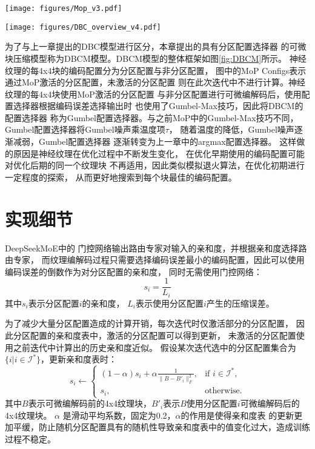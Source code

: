 \begin{figure*}[htbp]
    \centering
    \texttt{[image: figures/Mop\_v3.pdf]}
    \caption{基于混合专家模型的分区配置选择器(MoP)}
    \label{fig:Mop}
\end{figure*}

\begin{figure*}[htbp]
    \centering
    \texttt{[image: figures/DBC\_overview\_v4.pdf]}
    \caption{基于MoP的DBCM模型的整体框架}
    \label{fig:DBCM}
\end{figure*}

为了与上一章提出的DBC模型进行区分，本章提出的具有分区配置选择器
的可微块压缩模型称为DBCM模型。DBCM模型的整体框架如图\ref{fig:DBCM}所示。
神经纹理的每4x4块的编码配置分为分区配置与非分区配置，
图中的MoP Configs表示通过MoP激活的分区配置，未激活的分区配置
则在此次迭代中不进行计算。神经纹理的每4x4块使用MoP激活的分区配置
与非分区配置进行可微编解码后，使用配置选择器根据编码误差选择输出时
也使用了Gumbel-Max技巧，因此将DBCM的配置选择器
称为Gumbel配置选择器。与之前MoP中的Gumbel-Max技巧不同，
Gumbel配置选择器将Gumbel噪声乘温度项$\tau$，
随着温度的降低，Gumbel噪声逐渐减弱，Gumbel配置选择器
逐渐转变为上一章中的argmax配置选择器。
这样做的原因是神经纹理在优化过程中不断发生变化，
在优化早期使用的编码配置可能对优化后期的同一个纹理块
不再适用，因此类似模拟退火算法，在优化初期进行一定程度的探索，
从而更好地搜索到每个块最佳的编码配置。

\section{实现细节}

DeepSeekMoE\cite{dai2024deepseekmoe}中的
门控网络输出路由专家对输入的亲和度，并根据亲和度选择路由专家，
而纹理编解码过程只需要选择编码误差最小的编码配置，因此可以使用编码误差的倒数作为对分区配置的亲和度，
同时无需使用门控网络：
\begin{equation}
s_i=\frac{1}{L_i}
\end{equation}
其中$s_i$表示分区配置$i$的亲和度，
$L_i$表示使用分区配置$i$产生的压缩误差。

为了减少大量分区配置造成的计算开销，每次迭代时仅激活部分的分区配置，
因此分区配置的亲和度表中，激活的分区配置可以得到更新，
未激活的分区配置使用之前迭代中计算出的历史亲和度近似。
假设某次迭代选中的分区配置集合为$\{i|i\in\mathcal{I}^*\}$，更新亲和度表时：
\begin{equation}
    s_i\leftarrow
    \begin{cases} 
        (1-\alpha)s_i+\alpha\frac{1}{\|B-B'_i\|_F^2}, & \text{if } i\in\mathcal{I}^*,\\
    s_i, & \text{otherwise}.
    \end{cases}
\end{equation}
其中$B$表示可微编解码前的4x4纹理块，$B'_i$表示$B$使用分区配置$i$可微编解码后的4x4纹理块。
$\alpha$ 是滑动平均系数，固定为0.2，$\alpha$的作用是使得亲和度表
的更新更加平缓，防止随机分区配置具有的随机性导致亲和度表中的值变化过大，造成训练过程不稳定。

